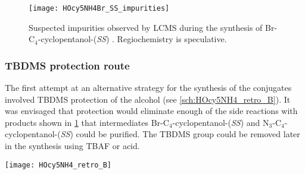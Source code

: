 \begin{figure}[H]
	\begin{center}
		\texttt{[image: HOcy5NH4Br\_SS\_impurities]}
		\caption{Suspected impurities observed by LCMS during the synthesis of Br-C$_4$-cyclopentanol-(\textit{SS}) .
		Regiochemistry is speculative.
		\label{fig:HOcy5NH4Br_SS_impurities}}
	\end{center}
\end{figure}

\subsubsection{TBDMS protection route \label{sec:TBDMS}}

The first attempt at an alternative strategy for the synthesis of the conjugates involved TBDMS protection of the alcohol (see \ref{sch:HOcy5NH4_retro_B}). It was envisaged that protection would eliminate enough of the side reactions with products shown in \ref{fig:HOcy5NH4Br_SS_impurities} that intermediates Br-C$_4$-cyclopentanol-(\textit{SS})  and N$_3$-C$_4$-cyclopentanol-(\textit{SS})  could be purified. The TBDMS group could be removed later in the synthesis using TBAF or acid.

\begin{scheme}[H]
	\begin{center}
		\texttt{[image: HOcy5NH4\_retro\_B]}
		\caption{Retrosynthesis of the cyclopentanol-CipMe conjugates 
		 (\textit{SS}) and   (\textit{RR}), 
		and the cyclopentanol-Cip triazole conjugates 
		 (\textit{SS}) and
		 (\textit{RR}) 
		using a TBDMS protection strategy. \textit{SS} enantiomers are shown, but both are implied.\label{sch:HOcy5NH4_retro_B}}
	\end{center}
\end{scheme}

